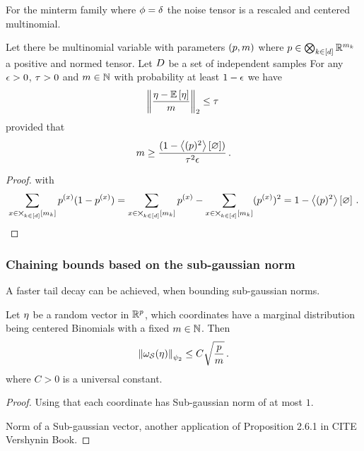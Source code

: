 For the minterm family where $\phi=\delta$ the noise tensor is a rescaled and centered multinomial.

\begin{corollary}
	Let there be multinomial variable with parameters $(p,m)$ where $p\in\bigotimes_{k\in[d]} \mathbb{R}^{m_{k}}$ a positive and normed tensor.
	Let $D$ be a set of independent samples
	For any $\epsilon>0$, $\tau>0$ and $m\in\mathbb{N}$ with probability at least $1-\epsilon$ we have
		\[ \left\|\frac{\eta-\mathbb{E}\left[\eta\right]}{m}\right\|_{2} \leq   \tau \, \]
	provided that
		\[ m \geq  \frac{(1-\left\langle (p)^2\right\rangle \left[ \varnothing \right])}{\tau^2 \epsilon} \, . \]
\end{corollary}
\begin{proof}
	 with
		\[ \sum_{x\in\bigtimes_{k\in[d]}[m_{k}]} p^{(x)}(1-p^{(x)}) = \sum_{x\in\bigtimes_{k\in[d]}[m_{k}]} p^{(x)} - \sum_{x\in\bigtimes_{k\in[d]}[m_{k}]} (p^{(x)})^2 = 1-\left\langle (p)^2\right\rangle \left[ \varnothing \right] \, . \]
\end{proof}



\subsubsection{Chaining bounds based on the sub-gaussian norm}


A faster tail decay can be achieved, when bounding sub-gaussian norms.


\begin{theorem}
	Let $\eta$ be a random vector in $\mathbb{R}^p$, which coordinates have a marginal distribution being centered Binomials with a fixed $m\in\mathbb{N}$.
	Then
		\[ \left\|\omega_{\mathcal{S}}(\eta)\right\|_{\psi_2} \leq C \sqrt{\frac{p}{m}} \, . \]
	where $C>0$ is a universal constant.
\end{theorem}
\begin{proof}
	Using that each coordinate has Sub-gaussian norm of at most $1$.

	
	Norm of a Sub-gaussian vector, another application of Proposition 2.6.1 in CITE Vershynin Book.
\end{proof}




